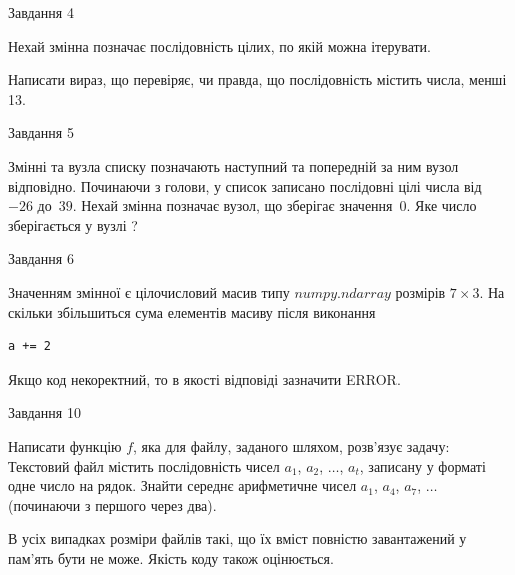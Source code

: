 \documentclass[12pt, ukrainian]{article}
\begin{document}
{               
{\begin{center}Завдання {4}\end{center}}
\vspace{-6mm}
Нехай змінна  позначає послідовність цілих, по якій можна ітерувати.

Написати вираз, що перевіряє, чи правда, що послідовність  містить числа, менші 13.\par

\vspace{10mm}
               
{\begin{center}Завдання {5}\end{center}}
\vspace{-6mm}
Змінні  та  вузла списку позначають наступний та попередній за ним вузол відповідно. Починаючи з голови, у список записано послідовні цілі числа від~$-26$ до~$39$. Нехай змінна  позначає вузол, що зберігає значення~$0$.
Яке число зберігається у вузлі  ?\par

               
{\begin{center}Завдання {6}\end{center}}
\vspace{-6mm}
Значенням змінної  є цілочисловий масив типу $numpy.ndarray$ розмірів $7{\times}3$. На скільки збільшиться сума елементів масиву  після виконання
\begin{verbatim}
a += 2
\end{verbatim}


Якщо код некоректний, то в якості відповіді зазначити ERROR.\par

               
{\begin{center}Завдання {10}\end{center}}
\vspace{-6mm}

Написати функцію $f$, яка для файлу, заданого шляхом, розв’язує задачу:\\ Текстовий файл містить послідовність чисел $a_1$, $a_2$, $\ldots$, $a_t$, записану у форматі одне число на рядок. Знайти середнє арифметичне чисел $a_1$, $a_4$, $a_7$, $\ldots$ (починаючи з першого через два).

В усіх випадках розміри файлів такі, що їх вміст повністю завантажений у пам'ять бути не може. Якість коду також оцінюється.



}
\end{document}
